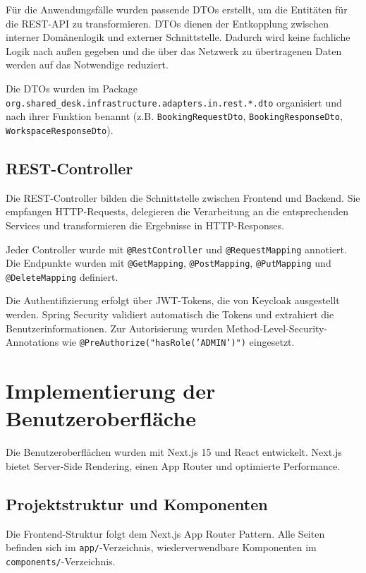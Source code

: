\documentclass[11pt,a4paper]{report}
\begin{document}
Für die Anwendungsfälle wurden passende DTOs erstellt, um die Entitäten für die REST-API zu transformieren. DTOs dienen der Entkopplung zwischen interner Domänenlogik und externer Schnittstelle. Dadurch wird keine fachliche Logik nach außen gegeben und die über das Netzwerk zu übertragenen Daten werden auf das Notwendige reduziert.

Die DTOs wurden im Package \texttt{org.shared\_desk.infrastructure.adapters.in.rest.*.dto} organisiert und nach ihrer Funktion benannt (z.B. \texttt{BookingRequestDto}, \texttt{BookingResponseDto}, \texttt{WorkspaceResponseDto}).

\subsection{REST-Controller}

Die REST-Controller bilden die Schnittstelle zwischen Frontend und Backend. Sie empfangen HTTP-Requests, delegieren die Verarbeitung an die entsprechenden Services und transformieren die Ergebnisse in HTTP-Responses.

Jeder Controller wurde mit \texttt{@RestController} und \texttt{@RequestMapping} annotiert. Die Endpunkte wurden mit \texttt{@GetMapping}, \texttt{@PostMapping}, \texttt{@PutMapping} und \texttt{@DeleteMapping} definiert.

Die Authentifizierung erfolgt über JWT-Tokens, die von Keycloak ausgestellt werden. Spring Security validiert automatisch die Tokens und extrahiert die Benutzerinformationen. Zur Autorisierung wurden Method-Level-Security-Annotations wie \texttt{@PreAuthorize("hasRole('ADMIN')")} eingesetzt.

\section{Implementierung der Benutzeroberfläche}

Die Benutzeroberflächen wurden mit Next.js 15 und React entwickelt. Next.js bietet Server-Side Rendering, einen App Router und optimierte Performance.

\subsection{Projektstruktur und Komponenten}

Die Frontend-Struktur folgt dem Next.js App Router Pattern. Alle Seiten befinden sich im \texttt{app/}-Verzeichnis, wiederverwendbare Komponenten im \texttt{components/}-Verzeichnis.
\end{document}
